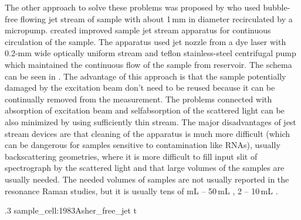 The other approach to solve these problems was proposed by
\textcite{Ziegler1981} who used bubble-free flowing jet stream of sample with
about 1\,mm in diameter recirculated by a micropump. \textcite{Asher1983}
created improved sample jet stream apparatus for continuous circulation of the
sample. The apparatus used jet nozzle from a dye laser with 0.2-mm wide
optically uniform stream and teflon stainless-steel centrifugal pump which
maintained the continuous flow of the sample from reservoir. The schema can be
seen in . The advantage of this
approach is that the sample potentially damaged by the excitation beam don't
need to be reused because it can be continually removed from the measurement.
The problems connected with absorption of excitation beam and selfabsorption
of the scattered light can be also minimized by using sufficiently thin stream.
The major disadvantages of jest stream devices are that cleaning of the
apparatus is much more difficult (which can be dangerous for samples sensitive
to contamination like RNAs), usually backscattering geometries, where it is
more difficult to fill input slit of spectrograph by the scattered light and
that large volumes of the samples are usually needed. The needed volumes of
samples are not usually reported in the resonance Raman studies, but it
is usually tens of mL -- 50\,mL \parencite{Ziegler1981},
2 -- 10\,mL \parencite{Fodor1985}.

%
{.3}%
{sample_cell:1983Asher_free_jet}
{t}
